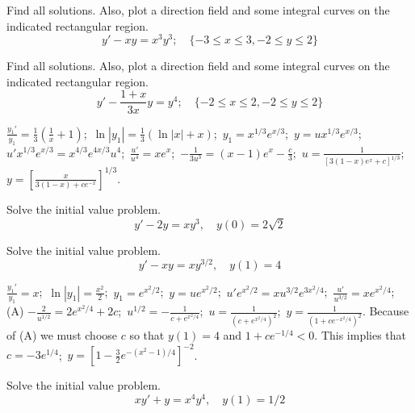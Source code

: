 \documentclass{ximera}
\begin{document}
 \begin{problem}\label{exer:2.4.5} Find all solutions. Also, plot a direction field and some integral curves on the indicated rectangular region.
$$y'-xy=x^3y^3;    \quad \{-3\leq x\leq 3, -2\leq y\leq 2\}$$
\end{problem}

\begin{problem}\label{exer:2.4.6} Find all solutions. Also, plot a direction field and some integral curves on the indicated rectangular region.
$$y'-\frac{1+x}{3x}y=y^4;   \quad \{-2\leq x\leq 2,-2\leq y \leq 2\}$$



\begin{solution}
    $\frac{y_1'}{ y_1}=\frac{1}{3}\left(\frac{1}{ x}+1\right)$;\,
$\ln|y_1|=\frac{1}{3}(\ln|x|+x)$;\,
$y_1=x^{1/3}e^{x/3}$;\,
$y=ux^{1/3}e^{x/3}$;\,
$u'x^{1/3}e^{x/3}=x^{4/3}e^{4x/3}u^4$;\,
$\frac{u'}{ u^4}=xe^x$;\,
$-\frac{1}{3u^3}=(x-1)e^x-\frac{c}{3}$;\,
$u=\frac{1}{[3(1-x)e^x+c]^{1/3}}$;\,
$y=\left[\frac{x}{3(1-x)+ce^{-x}}\right]^{1/3}$.
\end{solution}
\end{problem}

\begin{problem}\label{exer:2.4.7} Solve the initial value problem.
$$y'-2y=xy^3,\quad y(0)=2\sqrt2$$
\end{problem}

\begin{problem}\label{exer:2.4.8} Solve the initial value problem.
$$y'-xy=xy^{3/2},\quad y(1)=4$$



\begin{solution}
    $\frac{y_1'}{ y_1}=x$;\,
$\ln|y_1|=\frac{x^2}{2}$;\,
$y_1=e^{x^2/2}$;\,
$y=ue^{x^2/2}$;\,
$u'e^{x^2/2}=xu^{3/2}e^{3x^2/4}$;\,
$\frac{u'}{ u^{3/2}}=xe^{x^2/4}$;\,
(A) $-\frac{2}{ u^{1/2}}=2e^{x^2/4}+2c$;\,
$u^{1/2}=-\frac{1}{ c+e^{x^2/4}}$;\,
$u=\frac{1}{(c+e^{x^2/4})^2}$;\,
$y=\frac{1}{(1+ce^{-x^2/4})^2}$. Because of (A) we must choose $c$
so that $y(1)=4$ and $1+ce^{-1/4}<0$. This implies that
$c=-3e^{1/4}$;\,
$y=\left[1-\frac{3}{2}e^{-(x^2-1)/4}\right]^{-2}$.
\end{solution}
\end{problem}

\begin{problem}\label{exer:2.4.9} Solve the initial value problem.
$$xy'+y=x^4y^4,\quad y(1)=1/2$$
\end{problem}
\end{document}

